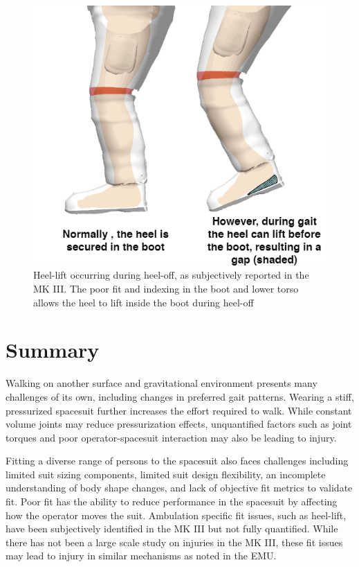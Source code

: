 \documentclass[defaultstyle,11pt]{comps}
\begin{document}
\begin{figure}
\hypertarget{fig:B-HeelLift}{%
\centering
\includegraphics{../fig/Background/HeelLift.png}
\caption{Heel-lift occurring during heel-off, as subjectively reported in the MK III. The poor fit and indexing in the boot and lower torso allows the heel to lift inside the boot during heel-off}\label{fig:B-HeelLift}
}
\end{figure}

\hypertarget{summary}{%
\section{Summary}\label{summary}}

Walking on another surface and gravitational environment presents many challenges of its own, including changes in preferred gait patterns.
Wearing a stiff, pressurized spacesuit further increases the effort required to walk.
While constant volume joints may reduce pressurization effects, unquantified factors such as joint torques and poor operator-spacesuit interaction may also be leading to injury.

Fitting a diverse range of persons to the spacesuit also faces challenges including limited suit sizing components, limited suit design flexibility, an incomplete understanding of body shape changes, and lack of objective fit metrics to validate fit.
Poor fit has the ability to reduce performance in the spacesuit by affecting how the operator moves the suit. Ambulation specific fit issues, such as heel-lift, have been subjectively identified in the MK III but not fully quantified.
While there has not been a large scale study on injuries in the MK III, these fit issues may lead to injury in similar mechanisms as noted in the EMU.
\end{document}
